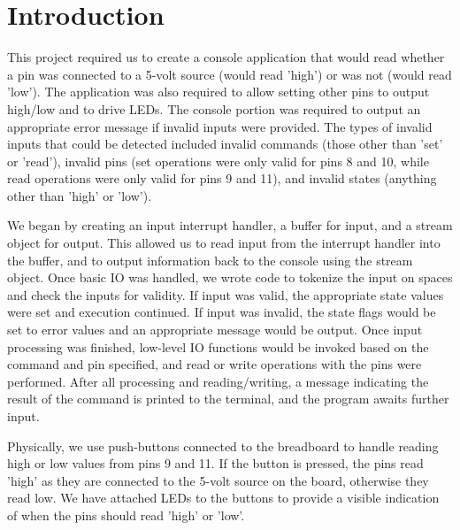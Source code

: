\documentclass[letterpaper,11pt]{texMemo} %
\begin{document}
\maketitle %


\section*{Introduction}

This project required us to create a console application that would read whether a pin was connected to a 5-volt source (would read 'high') or was not (would read 'low'). The application was also required to allow setting other pins to output high/low and to drive LEDs. The console portion was required to output an appropriate error message if invalid inputs were provided. The types of invalid inputs that could be detected included invalid commands (those other than 'set' or 'read'), invalid pins (set operations were only valid for pins 8 and 10, while read operations were only valid for pins 9 and 11), and invalid states (anything other than 'high' or 'low').

We began by creating an input interrupt handler, a buffer for input, and a stream object for output. This allowed us to read input from the interrupt handler into the buffer, and to output information back to the console using the stream object. Once basic IO was handled, we wrote code to tokenize the input on spaces and check the inputs for validity. If input was valid, the appropriate state values were set and execution continued. If input was invalid, the state flags would be set to error values and an appropriate message would be output. Once input processing was finished, low-level IO functions would be invoked based on the command and pin specified, and read or write operations with the pins were performed. After all processing and reading/writing, a message indicating the result of the command is printed to the terminal, and the program awaits further input.

Physically, we use push-buttons connected to the breadboard to handle reading high or low values from pins 9 and 11. If the button is pressed, the pins read 'high' as they are connected to the 5-volt source on the board, otherwise they read low. We have attached LEDs to the buttons to provide a visible indication of when the pins should read 'high' or 'low'.
\end{document}
